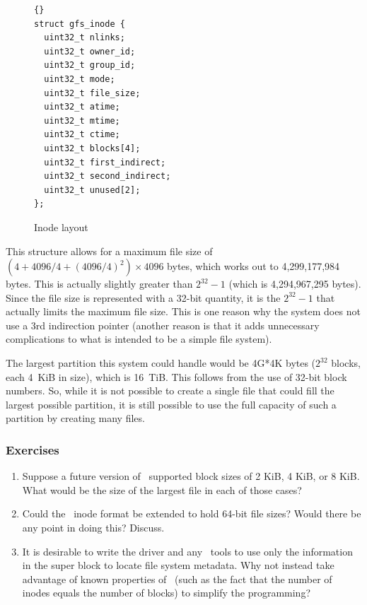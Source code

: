 \begin{figure}[htbp]
  \centering
  \begin{bigbox}
\begin{lstlisting}{}
struct gfs_inode {
  uint32_t nlinks;
  uint32_t owner_id;
  uint32_t group_id;
  uint32_t mode;
  uint32_t file_size;
  uint32_t atime;
  uint32_t mtime;
  uint32_t ctime;
  uint32_t blocks[4];
  uint32_t first_indirect;
  uint32_t second_indirect;
  uint32_t unused[2];
};
\end{lstlisting}
  \end{bigbox}
  \caption{Inode layout}
  \label{fig:inode-layout}
\end{figure}

This structure allows for a maximum file size of $(4 + 4096/4 + (4096/4)^2) \times 4096$ bytes,
which works out to 4,299,177,984 bytes. This is actually slightly greater than $2^{32} - 1$
(which is 4,294,967,295 bytes). Since the file size is represented with a 32-bit quantity, it is
the $2^{32} - 1$ that actually limits the maximum file size. This is one reason why the system
does not use a 3rd indirection pointer (another reason is that it adds unnecessary complications
to what is intended to be a simple file system).

The largest partition this system could handle would be 4G*4K bytes ($2^{32}$ blocks, each 4~KiB
in size), which is 16~TiB. This follows from the use of 32-bit block numbers. So, while it is
not possible to create a single file that could fill the largest possible partition, it is still
possible to use the full capacity of such a partition by creating many files.

\subsubsection*{Exercises}

\begin{enumerate}

\item Suppose a future version of \GenericFS\ supported block sizes of 2 KiB, 4 KiB, or 8 KiB.
  What would be the size of the largest file in each of those cases?

\item Could the \GenericFS\ inode format be extended to hold 64-bit file sizes? Would there be
  any point in doing this? Discuss.

\item It is desirable to write the driver and any \GenericFS\ tools to use only the information
  in the super block to locate file system metadata. Why not instead take advantage of known
  properties of \GenericFS\ (such as the fact that the number of inodes equals the number of
  blocks) to simplify the programming?

\end{enumerate}

